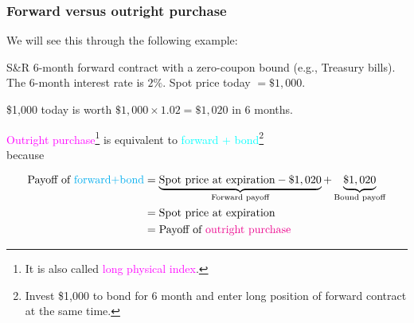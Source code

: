 \begin{frame}[fragile,t]
	\frametitle{Forward versus outright purchase}
	We will see this through the following example:

	\begin{myexample}
		S\&R 6-month forward contract with a zero-coupon bound (e.g., Treasury bills).
		The 6-month interest rate is $2\%$. Spot price today $= \$1,000$.
	\end{myexample}
\end{frame}
\begin{frame}[fragile,t]
	\begin{center}
		\$1,000 today is worth $\$1,000 \times 1.02 = \$1,020$ in 6 months.

	\bigskip
	\mySeparateLine
	\bigskip

	\textcolor{magenta}{Outright purchase}\footnote{It is also called \textcolor{magenta}{long physical index}.} is equivalent to
	\textcolor{cyan}{forward + bond}\footnote{Invest \$1,000 to bond for 6 month and enter long
	position of forward contract at the same time.}\\

	\bigskip
	because\\
	\bigskip

	\begin{align*}
		\text{Payoff of \textcolor{cyan}{forward+bond}} & = \underbrace{\text{Spot price at expiration} - \$1,020}_{\text{Forward payoff}} + \underbrace{\$1,020}_{\text{Bound payoff}} \\
                                                    & = \text{Spot price at expiration}                                                                                             \\
																										& = \text{Payoff of \textcolor{magenta}{outright purchase}}
	\end{align*}

	\end{center}
\end{frame}

